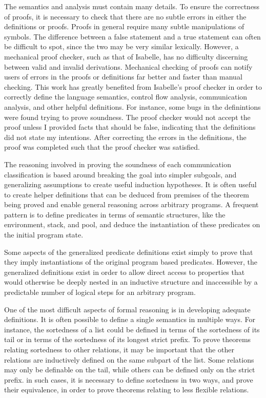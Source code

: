 \documentclass[letterpaper, 11pt]{extarticle}
\begin{document}
The semantics and analysis must contain many details. To ensure the
correctness of proofs, it is necessary to check that there are no subtle errors in either the 
definitions or proofs. Proofs in general require many subtle manipulations of symbols. The
difference between a false statement and a true statement can often be difficult to spot, since
the two may be very similar lexically. However, a mechanical proof checker, such as that of 
Isabelle, has no difficulty discerning between valid and invalid derivations.
Mechanical checking of proofs can notify users of errors in the proofs or definitions far better
and faster than manual checking. This work has greatly benefited from Isabelle's proof checker in
order to correctly define the language semantics, control flow analysis, communication analysis,
and other helpful definitions. For instance, some bugs in the
definintions were found trying to prove
soundness. The proof checker would not accept the proof unless I provided facts that
should be false, indicating that the definitions did not state my intentions.
After correcting the errors in the definitions, the proof was completed such that the proof
checker was satisfied.

The reasoning involved in proving the soundness of each communication classification
is based around breaking the goal into simpler subgoals, and generalizing assumptions to create
useful induction hypotheses. It is often useful to
create helper definitions that can be deduced
from premises of the theorem being proved and enable
general reasoning across arbitrary programs.
A frequent pattern is to define
predicates in terms of semantic structures, like the environment, stack, and pool, and deduce 
the instantiation of these predicates on the initial program state. 

Some aspects of the generalized predicate definitions exist simply to prove that they imply
instantiations of the original program based predicates. However, the generalized
definitions exist in order to allow direct access to properties that would
otherwise be deeply nested
in an inductive structure and inaccessible by a predictable number of
logical steps for an arbitrary
program.

One of the most difficult aspects of formal reasoning is in developing adequate definitions.
It is often possible to define a single semantics in multiple ways.
For instance, the sortedness of a list could be defined in terms of the sortedness of its tail
or in terms of the sortedness of its longest strict prefix. To prove theorems relating
sortedness to other relations, it may be important that the other relations are inductively
defined on the same subpart of the list. Some relations may only be definable on the tail,
while others can be defined only on the strict prefix. in such cases, it is necessary to
define sortedness in two ways, and prove their equivalence, in order to prove theorems relating
to less flexible relations.
\end{document}
